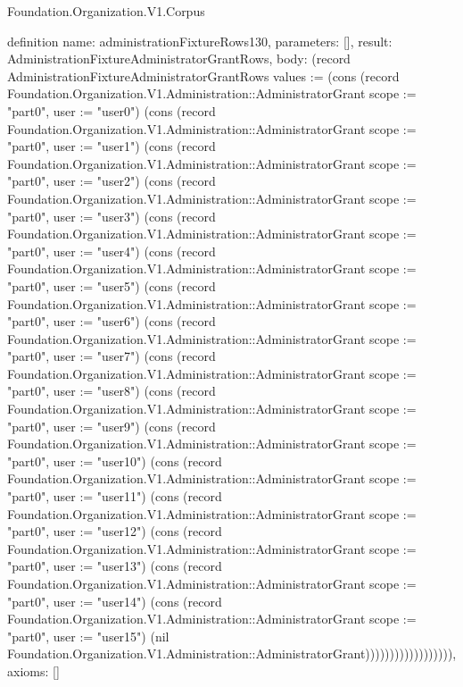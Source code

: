 \begin{lexlean}{Foundation.Organization.V1.Corpus}
\begin{semanticmodule}
definition{
  name: administrationFixtureRows130,
  parameters: [],
  result: AdministrationFixtureAdministratorGrantRows,
  body: (record AdministrationFixtureAdministratorGrantRows {values := (cons (record Foundation.Organization.V1.Administration::AdministratorGrant {scope := "part0", user := "user0"}) (cons (record Foundation.Organization.V1.Administration::AdministratorGrant {scope := "part0", user := "user1"}) (cons (record Foundation.Organization.V1.Administration::AdministratorGrant {scope := "part0", user := "user2"}) (cons (record Foundation.Organization.V1.Administration::AdministratorGrant {scope := "part0", user := "user3"}) (cons (record Foundation.Organization.V1.Administration::AdministratorGrant {scope := "part0", user := "user4"}) (cons (record Foundation.Organization.V1.Administration::AdministratorGrant {scope := "part0", user := "user5"}) (cons (record Foundation.Organization.V1.Administration::AdministratorGrant {scope := "part0", user := "user6"}) (cons (record Foundation.Organization.V1.Administration::AdministratorGrant {scope := "part0", user := "user7"}) (cons (record Foundation.Organization.V1.Administration::AdministratorGrant {scope := "part0", user := "user8"}) (cons (record Foundation.Organization.V1.Administration::AdministratorGrant {scope := "part0", user := "user9"}) (cons (record Foundation.Organization.V1.Administration::AdministratorGrant {scope := "part0", user := "user10"}) (cons (record Foundation.Organization.V1.Administration::AdministratorGrant {scope := "part0", user := "user11"}) (cons (record Foundation.Organization.V1.Administration::AdministratorGrant {scope := "part0", user := "user12"}) (cons (record Foundation.Organization.V1.Administration::AdministratorGrant {scope := "part0", user := "user13"}) (cons (record Foundation.Organization.V1.Administration::AdministratorGrant {scope := "part0", user := "user14"}) (cons (record Foundation.Organization.V1.Administration::AdministratorGrant {scope := "part0", user := "user15"}) (nil Foundation.Organization.V1.Administration::AdministratorGrant)))))))))))))))))}),
  axioms: []
}


\end{semanticmodule}
\end{lexlean}
